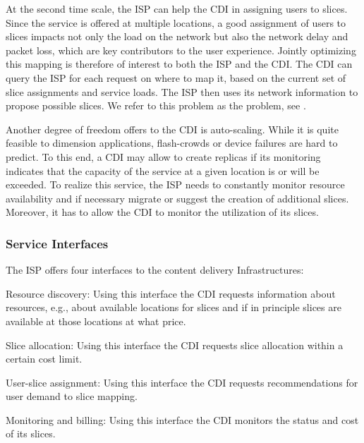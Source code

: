 At the second time scale, the ISP can help the CDI in assigning users to
slices. Since the service is offered at multiple locations, a good assignment
of users to slices impacts not only the load on the network but also the
network delay and packet loss, which are key contributors to the user
experience. Jointly optimizing this mapping is therefore of interest to both
the ISP and the CDI. The CDI can query the ISP for each request on where to map
it, based on the current set of slice assignments and service loads. The ISP
then uses its network information to propose possible slices. We refer to this
problem as the \sliceassignment problem, see \cite{Cate-CCR}.

Another degree of freedom \onservice offers to the CDI is auto-scaling.  While
it is quite feasible to dimension applications, flash-crowds or device failures
are hard to predict. To this end, a CDI may allow \onservice to create replicas
if its monitoring indicates that the capacity of the service at a given
location is or will be exceeded.  To realize this service, the ISP needs to
constantly monitor resource availability and if necessary migrate or suggest
the creation of additional slices. Moreover, it has to allow the CDI to monitor
the utilization of its slices.


\subsubsection{Service Interfaces}\label{sec:service-interfaces}

The ISP offers four interfaces to the content delivery Infrastructures:

\begin{description*}

\item [Resource discovery:] Using this interface the CDI requests information
about resources, e.g., about available locations for slices and if in principle
slices are available at those locations at what price.

\item [Slice allocation:] Using this interface the CDI requests slice
allocation within a certain cost limit.

\item [User-slice assignment:] Using this interface the CDI requests
recommendations for user demand to slice mapping.

\item [Monitoring and billing:] Using this interface the CDI monitors the
status and cost of its slices.

\end{description*}

